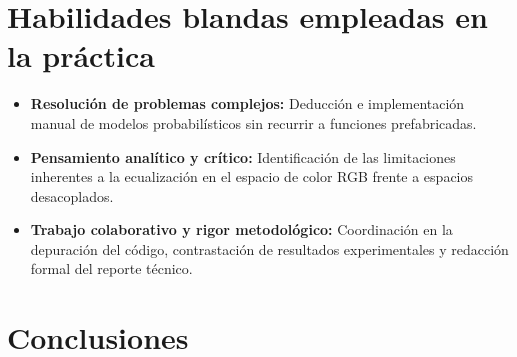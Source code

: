 \documentclass[12pt,a4paper]{article}
\newcommand{\checkedbox}{\boxtimes}
\begin{document}
\section{Habilidades blandas empleadas en la práctica}

\begin{itemize}
    \item[$\checkedbox$] \textbf{Resolución de problemas complejos:} Deducción e implementación manual de modelos probabilísticos sin recurrir a funciones prefabricadas.
    \item[$\checkedbox$] \textbf{Pensamiento analítico y crítico:} Identificación de las limitaciones inherentes a la ecualización en el espacio de color RGB frente a espacios desacoplados.
    \item[$\checkedbox$] \textbf{Trabajo colaborativo y rigor metodológico:} Coordinación en la depuración del código, contrastación de resultados experimentales y redacción formal del reporte técnico.
\end{itemize}

\section{Conclusiones}
\end{document}
